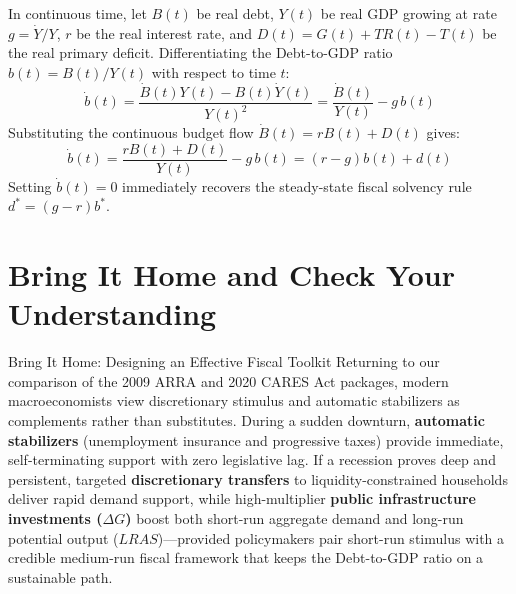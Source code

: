 \documentclass[11pt,letterpaper]{article}
\begin{document}
\begin{takeaways}
In continuous time, let $B(t)$ be real debt, $Y(t)$ be real GDP growing at rate $g = \dot{Y}/Y$, $r$ be the real interest rate, and $D(t) = G(t) + TR(t) - T(t)$ be the real primary deficit. Differentiating the Debt-to-GDP ratio $b(t) = B(t)/Y(t)$ with respect to time $t$:
\[
\dot{b}(t) = \frac{\dot{B}(t)Y(t) - B(t)\dot{Y}(t)}{Y(t)^2} = \frac{\dot{B}(t)}{Y(t)} - g\,b(t)
\]
Substituting the continuous budget flow $\dot{B}(t) = r B(t) + D(t)$ gives:
\[
\dot{b}(t) = \frac{r B(t) + D(t)}{Y(t)} - g\,b(t) = (r - g)b(t) + d(t)
\]
Setting $\dot{b}(t) = 0$ immediately recovers the steady-state fiscal solvency rule $d^* = (g - r)b^*$.
\end{takeaways}

\section{Bring It Home and Check Your Understanding}

\begin{examplecase}{Bring It Home: Designing an Effective Fiscal Toolkit}
Returning to our comparison of the 2009 ARRA and 2020 CARES Act packages, modern macroeconomists view discretionary stimulus and automatic stabilizers as complements rather than substitutes. During a sudden downturn, \textbf{automatic stabilizers} (unemployment insurance and progressive taxes) provide immediate, self-terminating support with zero legislative lag. If a recession proves deep and persistent, targeted \textbf{discretionary transfers} to liquidity-constrained households deliver rapid demand support, while high-multiplier \textbf{public infrastructure investments ($\Delta G$)} boost both short-run aggregate demand and long-run potential output ($LRAS$)---provided policymakers pair short-run stimulus with a credible medium-run fiscal framework that keeps the Debt-to-GDP ratio on a sustainable path.
\end{examplecase}
\end{document}
